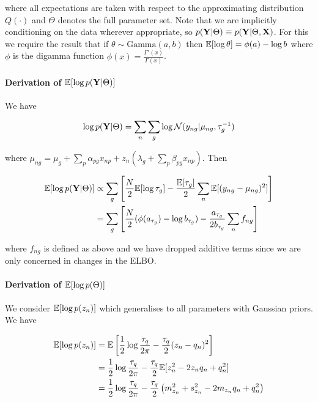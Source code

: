 where all expectations are taken with respect to the approximating distribution $Q(\cdot)$ and $\Theta$ denotes the full parameter set. Note that we are implicitly conditioning on the data wherever appropriate, so $p({\bf Y} | \Theta) \equiv p({\bf Y} | \Theta, {\bf X})$. For this we require the result that if $\theta \sim \text{Gamma}(a, b)$ then $\mathbb{E}[\log \theta] = \phi(a) - \log b$ where $\phi$ is the digamma function $\phi(x) = \frac{\Gamma'(x)}{\Gamma(x)}$.

\paragraph{Derivation of $\mathbb{E}[\log p({\bf Y} | \Theta)]$}

We have

\begin{equation}
\log p({\bf Y} | \Theta) = \sum_n \sum_g \log \mathcal{N}(y_{ng} | \mu_{ng}, \tau_g^{-1})
\end{equation}

where $\mu_{ng} = \mu_g + \sum_p \alpha_{pg} x_{np} + z_n \left( \lambda_g + \sum_p \beta_{pg} x_{np} \right)$. Then

\begin{equation}
\begin{aligned}
\mathbb{E}[ \log p({\bf Y} | \Theta) ] & \propto \sum_g \left[ \frac{N}{2} \mathbb{E}[\log \tau_g] -
\frac{\mathbb{E}[\tau_g]}{2} \sum_n \mathbb{E}[ (y_{ng} - \mu_{ng})^2 ] \right] \\
& = \sum_g \left[
\frac{N}{2} (\phi(a_{\tau_g}) - \log b_{\tau_g}) - \frac{a_{\tau_g}}{2 b_{\tau_g}} \sum_n f_{ng}
\right]
\end{aligned}
\end{equation}

where $f_{ng}$ is defined as above and we have dropped additive terms since we are only concerned in changes in the ELBO.

\paragraph{Derivation of  $\mathbb{E}[\log p(\Theta)]$}

We consider $\mathbb{E}[\log p (z_n)]$ which generalises to all parameters with Gaussian priors. We have

\begin{equation}
\begin{aligned}
\mathbb{E}[\log p (z_n)] &= \mathbb{E}\left[ \frac{1}{2} \log \frac{\tau_q}{2 \pi} - \frac{\tau_q}{2} (z_n - q_n)^2 \right] \\
& = \frac{1}{2} \log \frac{\tau_q}{2 \pi} - \frac{\tau_q}{2} \mathbb{E}[ z_n^2 - 2 z_n q_n + q_n^2 ] \\
& = \frac{1}{2} \log \frac{\tau_q}{2 \pi} - \frac{\tau_q}{2} \left( m_{z_n}^2 + s_{z_n}^2 - 2 m_{z_n} q_n + q_n^2 \right)
\end{aligned}
\end{equation}

